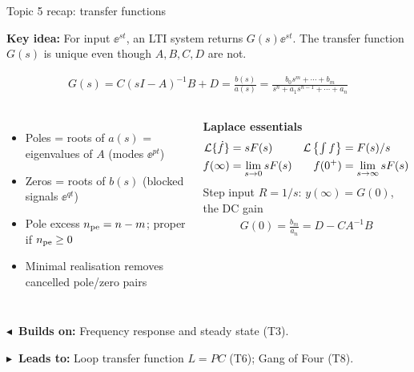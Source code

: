 \documentclass[10pt]{beamer-control}
\newcommand\LINKS[2]{%
  \par\vfill
  {\scriptsize\setlength\fboxsep{3pt}%
  \colorbox{AUHighlight!10}{\parbox{\dimexpr\linewidth-6pt\relax}{%
    \textbf{\color{AUHighlight}$\blacktriangleleft$~Builds on:} #1\par
    \textbf{\color{AUHighlight}$\blacktriangleright$~Leads to:} #2%
    \hfill\hyperlink{coursemap}{\beamerbutton{Course map}}}}}%
}
\newcommand\KEYIDEA[1]{%
  {\setlength\fboxsep{4pt}%
  \colorbox{NorthTce!12}{\parbox{\dimexpr\linewidth-8pt\relax}{\small\textbf{Key idea:} #1}}}\par\smallskip
}
\begin{document}
\begin{frame}[label=topic5]{Topic 5 recap: transfer functions}
  \KEYIDEA{For input $\ee^{st}$, an LTI system returns $G(s)\ee^{st}$. The transfer function $G(s)$ is unique even though $A,B,C,D$ are not.}
  \vspace{-1ex}
  \begin{align*}
    G(s) = C(sI-A)^{-1}B + D = \frac{b(s)}{a(s)} = \frac{b_0 s^m + \cdots + b_m}{s^n + a_1 s^{n-1} + \cdots + a_n}
  \end{align*}
  \begin{columns}[t]
    \footnotesize
    \begin{itemize}
      \item \alert{Poles} = roots of $a(s)$ = eigenvalues of $A$ (modes $\ee^{pt}$)
      \item \alert{Zeros} = roots of $b(s)$ (blocked signals $\ee^{qt}$)
      \item Pole excess $n_{\text{pe}} = n-m$; proper if $n_{\text{pe}}\ge 0$
      \item Minimal realisation removes cancelled pole/zero pairs
    \end{itemize}
    \footnotesize
    \textbf{Laplace essentials}
    \begin{align*}
      \mathcal{L}\{\dot f\} &= sF(s) & \mathcal{L}\left\{\textstyle\int f\right\} &= F(s)/s\\
      f(\infty) &= \lim_{s\to 0} sF(s) & f(0^+) &= \lim_{s\to\infty} sF(s)
    \end{align*}
    Step input $R=1/s$: \alert{$y(\infty) = G(0)$}, the DC gain
    \begin{align*}
      G(0) = \frac{b_m}{a_n} = D - CA^{-1}B
    \end{align*}
  \end{columns}
  \LINKS{Frequency response and steady state (T3).}{Loop transfer function $L=PC$ (T6); Gang of Four (T8).}
\end{frame}
\end{document}
